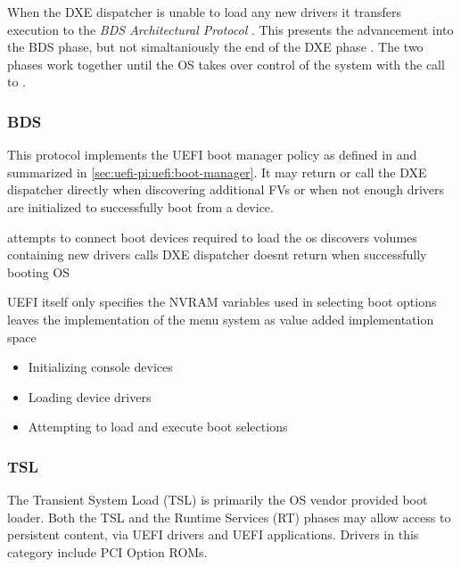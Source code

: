 When the \ac{DXE} dispatcher is unable to load any new drivers it transfers execution to the \emph{\ac{BDS} Architectural Protocol} \cite[Vol. 2, 2.4]{pi-spec}.
This presents the advancement into the \ac{BDS} phase, but not simaltaniously the end of the \ac{DXE} phase \cite[Vol. 2, 2.1]{pi-spec}.
The two phases work together until the \ac{OS} takes over control of the system with the call to .

\subsubsection{\acf{BDS}}

This protocol implements the \ac{UEFI} boot manager policy as defined in \cite[Section 3]{uefi-spec} and summarized in \autoref{sec:uefi-pi:uefi:boot-manager}.
It may return or call the \ac{DXE} dispatcher directly when discovering additional \acp{FV} or when not enough drivers are initialized to successfully boot from a device.


attempts to connect boot devices required to load the os
discovers volumes containing new drivers
calls DXE dispatcher
doesnt return when successfully booting OS

UEFI itself only specifies the NVRAM variables used in selecting boot options
leaves the implementation of the menu system as value added implementation space \cite{uefi-spec}

\cite{pi-spec}

\begin{itemize}
    \item Initializing console devices
    \item Loading device drivers
    \item Attempting to load and execute boot selections
\end{itemize}

\subsubsection{\acf{TSL}}

The Transient System Load (TSL) is primarily the OS vendor provided boot loader. Both the TSL and the Runtime Services (RT) phases may allow access to persistent content, via UEFI drivers and UEFI applications. Drivers in this category include PCI Option ROMs.

